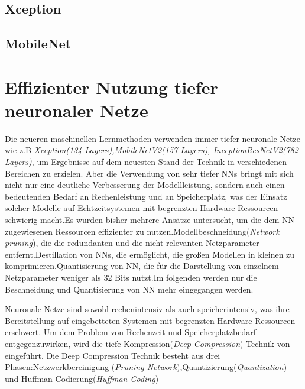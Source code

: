 \documentclass[12pt,a4paper]{scrartcl}
\numberwithin{equation}{section}
\begin{document}
 \subsection{Xception}
 \subsection{MobileNet}

 
\section{Effizienter Nutzung tiefer neuronaler Netze}
  Die neueren maschinellen Lernmethoden verwenden immer tiefer neuronale Netze wie z.B \textit{Xception(134 Layers),MobileNetV2(157 Layers), InceptionResNetV2(782 Layers)}, um Ergebnisse auf dem neuesten Stand der Technik in verschiedenen Bereichen zu erzielen. Aber die Verwendung von sehr tiefer \acsp{NN} bringt mit sich nicht nur eine deutliche Verbesserung der Modellleistung, sondern auch einen bedeutenden Bedarf an Rechenleistung und an Speicherplatz, was der Einsatz solcher Modelle auf Echtzeitsystemen mit begrenzten Hardware-Ressourcen schwierig macht.Es wurden bisher mehrere Ansätze untersucht, um die dem \ac{NN} zugewiesenen Ressourcen effizienter zu nutzen.Modellbeschneidung(\textit{Network pruning}), die die redundanten und  die nicht relevanten Netzparameter entfernt.Destillation von \acsp{NN}, die ermöglicht, die großen Modellen in kleinen  zu komprimieren.Quantisierung von \ac{NN}, die für die Darstellung von einzelnem Netzparameter weniger als 32 Bits nutzt.Im folgenden werden nur die Beschneidung und Quantisierung von \ac{NN} mehr eingegangen werden.

  Neuronale Netze sind sowohl rechenintensiv als auch speicherintensiv, was ihre Bereitstellung auf eingebetteten Systemen mit begrenzten Hardware-Ressourcen erschwert\cite{5}. 
  Um dem Problem von Rechenzeit und Speicherplatzbedarf entgegenzuwirken, wird die tiefe Kompression(\textit{Deep Compression}) Technik von \cite[Han et al]{5} eingeführt.
  Die Deep Compression Technik besteht aus drei Phasen:Netzwerkbereinigung (\textit{Pruning Network}),Quantizierung(\textit{Quantization}) und Huffman-Codierung(\textit{Huffman Coding})
  
\end{document}

